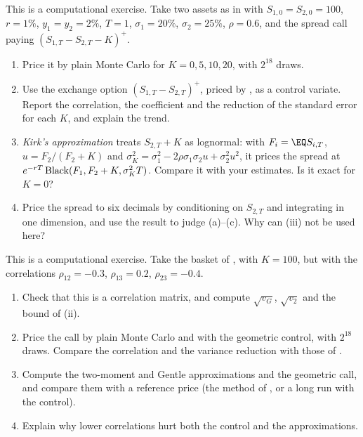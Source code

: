\begin{exercise}\label{ex:ma-spread}
\medium This is a computational exercise. Take two assets as in  with
$S_{1,0}=S_{2,0}=100$, $r=1\%$, $y_1=y_2=2\%$, $T=1$, $\sigma_1=20\%$, $\sigma_2=25\%$, $\rho=0.6$, and the
spread call paying $(S_{1,T}-S_{2,T}-K)^+$.
\begin{enumerate}[label=(\alph*)]
  \item Price it by plain Monte Carlo for $K=0,5,10,20$, with $2^{18}$ draws.
  \item Use the exchange option $(S_{1,T}-S_{2,T})^+$, priced by , as a control
    variate. Report the correlation, the coefficient and the reduction of the standard error for each $K$,
    and explain the trend.
  \item \emph{Kirk's approximation} treats $S_{2,T}+K$ as lognormal: with $F_i=\EQ S_{i,T}$, $u=F_2/(F_2+K)$
    and $\sigma_K^2=\sigma_1^2-2\rho\sigma_1\sigma_2u+\sigma_2^2u^2$, it prices the spread at
    $e^{-rT}\operatorname{Black}(F_1,F_2+K,\sigma_K^2T)$. Compare it with your estimates. Is it exact for $K=0$?
  \item Price the spread to six decimals by conditioning on $S_{2,T}$ and integrating in one dimension,
    and use the result to judge (a)--(c). Why can (iii) not be used here?
\end{enumerate}
\end{exercise}

\begin{exercise}\label{ex:ma-dispersion}
\medium This is a computational exercise. Take the basket of , with $K=100$,
but with the correlations $\rho_{12}=-0.3$, $\rho_{13}=0.2$, $\rho_{23}=-0.4$.
\begin{enumerate}[label=(\alph*)]
  \item Check that this is a correlation matrix, and compute $\sqrt{v_G}$, $\sqrt{v_2}$ and the bound of
    (ii).
  \item Price the call by plain Monte Carlo and with the geometric control, with $2^{18}$ draws. Compare
    the correlation and the variance reduction with those of .
  \item Compute the two-moment and Gentle approximations and the geometric call, and compare them with
    a reference price (the method of , or a long run with the control).
  \item Explain why lower correlations hurt both the control and the approximations.
\end{enumerate}
\end{exercise}
